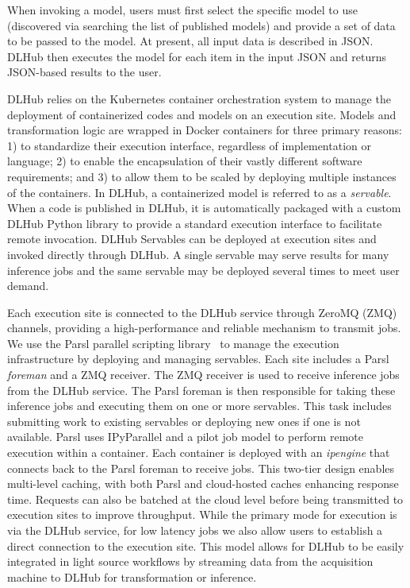 \documentclass{aip-cp}
\begin{document}
When invoking a model, users must first select the specific model to use
(discovered via searching the list of published models) and provide a set of
data to be passed to the model. At present, all input data is described in
JSON.  DLHub then executes the model for each item in the input JSON and
returns JSON-based results to the user.

DLHub relies on the Kubernetes container orchestration system to manage the
deployment of containerized codes and models on an execution site.  Models and
transformation logic are wrapped in Docker containers for three primary
reasons:  1) to standardize their execution interface, regardless of
implementation or language; 2) to enable the encapsulation of their vastly
different software requirements; and 3) to allow them to be scaled by deploying multiple instances of the containers. 
In DLHub, a containerized model is referred to as a \textit{servable}.  When a code is
published in DLHub, it is automatically packaged with a custom DLHub Python
library to provide a standard execution interface to facilitate remote
invocation. DLHub Servables can be deployed at execution sites and invoked
directly through DLHub.  A single servable may serve results for many
inference jobs and the same servable may be deployed several times to meet
user demand.

Each execution site is connected to the DLHub service through ZeroMQ (ZMQ)
channels, providing a high-performance and reliable mechanism to transmit
jobs. We use the Parsl parallel scripting library~\cite{parsl} to manage the
execution infrastructure by deploying and managing servables. Each site
includes a Parsl \textit{foreman} and a ZMQ receiver.  The ZMQ receiver is
used to receive inference jobs from the DLHub service.  The Parsl foreman is
then responsible for taking these inference jobs and executing them on one or
more servables. This task includes submitting work to existing servables or
deploying new ones if  one is not available. Parsl uses IPyParallel and a
pilot job  model to perform remote execution within a container.  Each
container is deployed with an \textit{ipengine} that  connects back to the
Parsl foreman to receive jobs.  This two-tier design enables multi-level
caching, with both Parsl and cloud-hosted caches enhancing response time.
Requests can also be  batched at the cloud level before being transmitted to
execution sites to improve throughput. While the primary mode for execution is
via the DLHub service,  for low latency jobs we also allow users to establish
a direct connection to the execution site. This model allows for DLHub to be
easily integrated in light source workflows by streaming data from the
acquisition machine to DLHub for transformation or inference.
\end{document}
